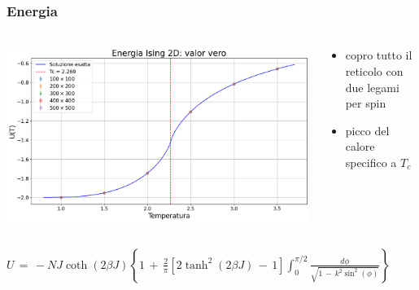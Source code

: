 \begin{frame}
    \frametitle{Energia}
    \framesubtitle{}

    \begin{columns}
        \begin{column}{0.6\textwidth}

            \centering
            \includegraphics[width=\textwidth]{Immagini/simIsing2D/ene.png}

        \end{column}
    
        \begin{column}{0.4\textwidth}


                \begin{itemize}[itemsep=0.5em, label=$\diamond$]
                    \item copro tutto il reticolo con due legami per spin
                    \item picco del calore specifico a $T_c$
                \end{itemize}
            
        \end{column}
    \end{columns}

    \vspace{0.5cm}
    \centering
    $U\,=\,-NJ\coth{\left(2\beta J\right)}\left\{1\,+\,\frac{2}{\pi}\left[2\tanh^2\left(2\beta J\right)\,-\,1\right]\int_0^{\pi/2}\frac{d\phi}{\sqrt{1\,-\,k^2\sin^2{\left(\phi\right)}}}\right\}$

\end{frame}
